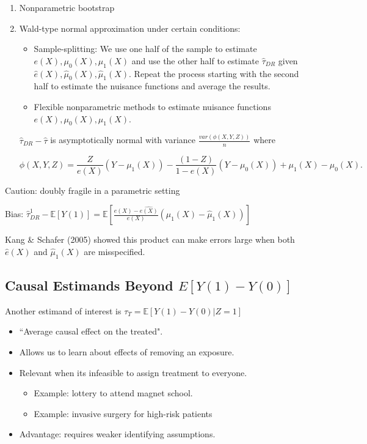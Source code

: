 \begin{enumerate}
    \item Nonparametric bootstrap
    \item Wald-type normal approximation under certain conditions:
    \begin{itemize}
        \item Sample-splitting: We use one half of the sample to estimate $e(X), \mu_0(X), \mu_1(X)$ and use the other half to estimate $\hat{\tau}_{DR}$ given $\hat{e}(X), \hat{\mu}_0(X), \hat{\mu}_1(X)$. Repeat the process starting with the second half to estimate the nuisance functions and average the results.
        \item Flexible nonparametric methods to estimate nuisance functions $e(X), \mu_0(X), \mu_1(X)$.
    \end{itemize}
    $\hat{\tau}_{DR} - \hat{\tau}$ is asymptotically normal with variance $\frac{var(\phi(X,Y,Z))}{n}$ where

    \[\phi(X,Y,Z)=\frac{Z}{e(X)}(Y-\mu_1(X))-\frac{(1-Z)}{1-e(X)}(Y-\mu_0(X))+\mu_1(X)-\mu_0(X).\]
    
\end{enumerate}

Caution: doubly fragile in a parametric setting

Bias: $\hat{\tau}^1_{DR}-\mathbb{E}[Y(1)]=\mathbb{E}\left[\frac{e(X)-\hat{e(X)}}{e(X)}(\mu_1(X)-\hat{\mu}_1(X))\right]$

Kang \& Schafer (2005) showed this product can make errors large when both $\hat{e}(X)$ and $\hat{\mu}_1(X)$ are misspecified.

\subsection{Causal Estimands Beyond $E[Y(1) - Y(0)]$}

Another estimand of interest is $\tau_T=\mathbb{E}[Y(1)-Y(0)|Z=1]$
\begin{itemize}
    \item ``Average causal effect on the treated".
    \item Allows us to learn about effects of removing an exposure.
    \item Relevant when its infeasible to assign treatment to everyone.
    \begin{itemize}
        \item Example: lottery to attend magnet school.
        \item Example: invasive surgery for high-risk patients
    \end{itemize}
    \item Advantage: requires weaker identifying assumptions.
\end{itemize}

